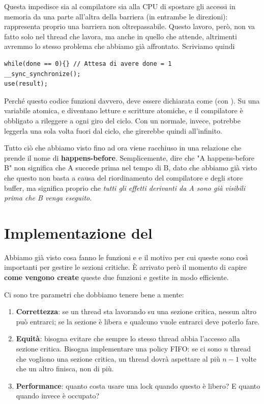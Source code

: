 \documentclass[11pt, a4paper, titlepage, oneside]{scrbook}
\begin{document}
Questa impedisce sia al compilatore sia alla CPU di spostare gli accessi in memoria da una parte all'altra della barriera (in entrambe le direzioni): rappresenta proprio una barriera non oltrepassabile. Questo lavoro, però, non va fatto solo nel thread che lavora, ma anche in quello che attende, altrimenti avremmo lo stesso problema che abbiamo già affrontato. Scriviamo quindi
\begin{lstlisting}[style=C]
while(done == 0){} // Attesa di avere done = 1
__sync_synchronize();
use(result);
\end{lstlisting}

\NB Perché questo codice funzioni davvero,  deve essere dichiarata come  (con ). Su una variabile atomica,  e  diventano letture e scritture atomiche, e il compilatore è obbligato a rileggere  a ogni giro del ciclo. Con un  normale, invece, potrebbe leggerla una sola volta fuori dal ciclo, che girerebbe quindi all'infinito.

Tutto ciò che abbiamo visto fino ad ora viene racchiuso in una relazione che prende il nome di \textbf{happens-before}. Semplicemente, dire che "A happens-before B" non significa che A succede prima nel tempo di B, dato che abbiamo già visto che questo non basta a causa del riordinamento del compilatore e degli store buffer, ma significa proprio che \textit{tutti gli effetti derivanti da A sono già visibili prima che B venga eseguito}.

\section{Implementazione del }

Abbiamo già visto cosa fanno le funzioni  e  e il motivo per cui queste sono così importanti per gestire le sezioni critiche. È arrivato però il momento di capire \textbf{come vengono create} queste due funzioni e gestite in modo efficiente.

Ci sono tre parametri che dobbiamo tenere bene a mente:
\begin{enumerate}
    \item \textbf{Correttezza}: se un thread sta lavorando su una sezione critica, nessun altro può entrarci; se la sezione è libera e qualcuno vuole entrarci deve poterlo fare.
    \item \textbf{Equità}: bisogna evitare che sempre lo stesso thread abbia l'accesso alla sezione critica. Bisogna implementare una policy FIFO: se ci sono $n$ thread che vogliono una sezione critica, un thread dovrà aspettare al più $n-1$ volte che un altro finisca, non di più.
    \item \textbf{Performance}: quanto costa usare una lock quando questo è libero? E quanto quando invece è occupato?
\end{enumerate}
\end{document}
